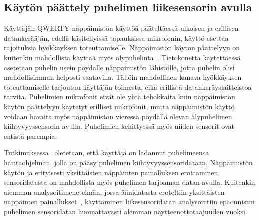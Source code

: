 \documentclass[finnish]{tktltiki2}
\theoremstyle{definition}
\theoremstyle{remark}
\begin{document}
\subsection{Käytön päättely puhelimen liikesensorin avulla}
Käyttäjän QWERTY-näppäimistön käyttöä pääteltäessä ulkoisen ja erillisen datankerääjän, edellä käsitellyissä tapauksissa mikrofonin, käyttö asettaa rajoituksia hyökkäyksen toteuttamiselle. Näppäimistön käytön päättelyyn on kuitenkin mahdollista käyttää myös älypuhelinta~\cite{mar}. Tietokonetta käytettäessä asetetaan puhelin usein pöydälle näppäimistön lähistölle, jotta puhelin olisi mahdollisimman helposti saatavilla. Tällöin mahdollinen kanava hyökkäyksen toteuttamiselle tarjoutuu käyttäjän toimesta, eikä erillistä datankeräyslaitteistoa tarvita. Puhelimien mikrofonit eivät ole yhtä tehokkaita kuin näppäimistön käytön päättelyyn käytetyt erilliset mikrofonit, mutta näppäimistön käyttö voidaan havaita myös näppäimistön vieressä pöydällä olevan älypuhelimen kiihtyvyyssensorin avulla. Puhelimien kehittyessä myös niiden sensorit ovat entistä parempia. 

Tutkimuksessa~\cite{mar} oletetaan, että käyttäjä on ladannut puhelimeensa haittaohjelman, jolla on pääsy puhelimen kiihtyvyyssensoridataan. Näppäimistön käytön ja erityisesti yksittäisten näppäinten painalluksen erottaminen sensoridatasta on mahdollista myös puhelimen tarjoaman datan avulla. Kuitenkin aiemman analysoitimenetelmän, jossa äänidatasta eroteltiin yksittäisten näppäinten painallukset~\cite{aso}, käyttäminen liikesensoridatan analysointiin epäonnistui puhelimen sensoridatan huomattavasti alemman näytteenottotaajuuden vuoksi. 
\end{document}

